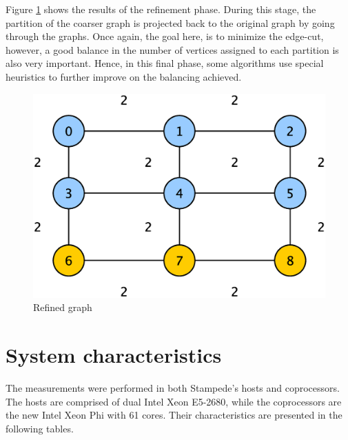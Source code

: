 \documentclass[abstract=on,9pt,twocolumn]{scrartcl}
\begin{document}
Figure \ref{img:refined_graph} shows the results of the refinement phase. During this stage, the partition of the coarser graph is projected back to the original graph by going through the graphs.\cite{Karypis:1998:FHQ:305219.305248}
Once again, the goal here, is to minimize the edge-cut, however, a good balance in the number of vertices assigned to each partition is also very important. Hence, in this final phase, some algorithms use special heuristics to further improve on the balancing achieved.
\begin{center}
  \begin{figure}[htb]
    \includegraphics[width=\columnwidth]{img/refinement.eps}
    \caption{Refined graph}
    \label{img:refined_graph} 
  \end{figure}
\end{center}



\section{System characteristics}
\label{sec:sys_char}

The measurements were performed in both Stampede's hosts and
coprocessors.
The hosts are comprised of dual Intel Xeon E5-2680, while the
coprocessors are the new Intel Xeon Phi with 61 cores. Their
characteristics are presented in the following tables.
\end{document}
